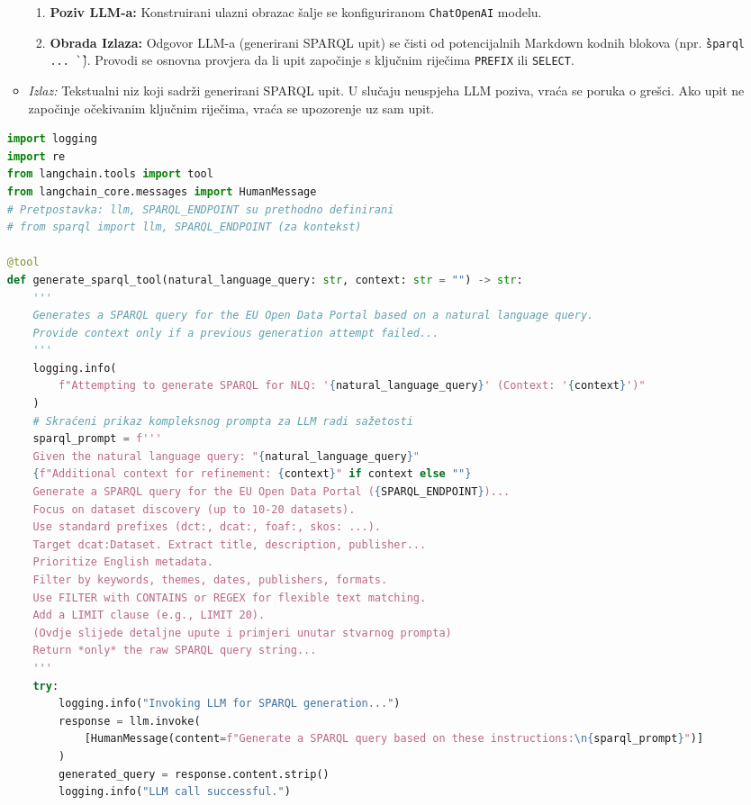\begin{itemize}
\begin{itemize}
\begin{enumerate}
            \item \textbf{Poziv LLM-a:} Konstruirani ulazni obrazac šalje se konfiguriranom \texttt{ChatOpenAI} modelu.
            \item \textbf{Obrada Izlaza:} Odgovor LLM-a (generirani SPARQL upit) se čisti od potencijalnih Markdown kodnih blokova (npr. \texttt{\`\`\`sparql ... \`\`\`}). Provodi se osnovna provjera da li upit započinje s ključnim riječima \texttt{PREFIX} ili \texttt{SELECT}.
        \end{enumerate}
        \item \textit{Izlaz:} Tekstualni niz koji sadrži generirani SPARQL upit. U slučaju neuspjeha LLM poziva, vraća se poruka o grešci. Ako upit ne započinje očekivanim ključnim riječima, vraća se upozorenje uz sam upit.
    \end{itemize}

\begin{lstlisting}[language=Python, caption=Ključni dijelovi alata za generiranje SPARQL upita (\texttt{generate\_sparql\_tool}), label=lst:generate_sparql_tool_sparql_py, basicstyle=\footnotesize\ttfamily, breaklines=true, morekeywords={tool, logging, HumanMessage, AIMessage}]
import logging
import re
from langchain.tools import tool
from langchain_core.messages import HumanMessage
# Pretpostavka: llm, SPARQL_ENDPOINT su prethodno definirani
# from sparql import llm, SPARQL_ENDPOINT (za kontekst)

@tool
def generate_sparql_tool(natural_language_query: str, context: str = "") -> str:
    '''
    Generates a SPARQL query for the EU Open Data Portal based on a natural language query.
    Provide context only if a previous generation attempt failed...
    '''
    logging.info(
        f"Attempting to generate SPARQL for NLQ: '{natural_language_query}' (Context: '{context}')"
    )
    # Skraćeni prikaz kompleksnog prompta za LLM radi sažetosti
    sparql_prompt = f'''
    Given the natural language query: "{natural_language_query}"
    {f"Additional context for refinement: {context}" if context else ""}
    Generate a SPARQL query for the EU Open Data Portal ({SPARQL_ENDPOINT})...
    Focus on dataset discovery (up to 10-20 datasets).
    Use standard prefixes (dct:, dcat:, foaf:, skos: ...).
    Target dcat:Dataset. Extract title, description, publisher...
    Prioritize English metadata.
    Filter by keywords, themes, dates, publishers, formats.
    Use FILTER with CONTAINS or REGEX for flexible text matching.
    Add a LIMIT clause (e.g., LIMIT 20).
    (Ovdje slijede detaljne upute i primjeri unutar stvarnog prompta)
    Return *only* the raw SPARQL query string...
    '''
    try:
        logging.info("Invoking LLM for SPARQL generation...")
        response = llm.invoke(
            [HumanMessage(content=f"Generate a SPARQL query based on these instructions:\n{sparql_prompt}")]
        )
        generated_query = response.content.strip()
        logging.info("LLM call successful.")


\end{lstlisting}
\end{itemize}
